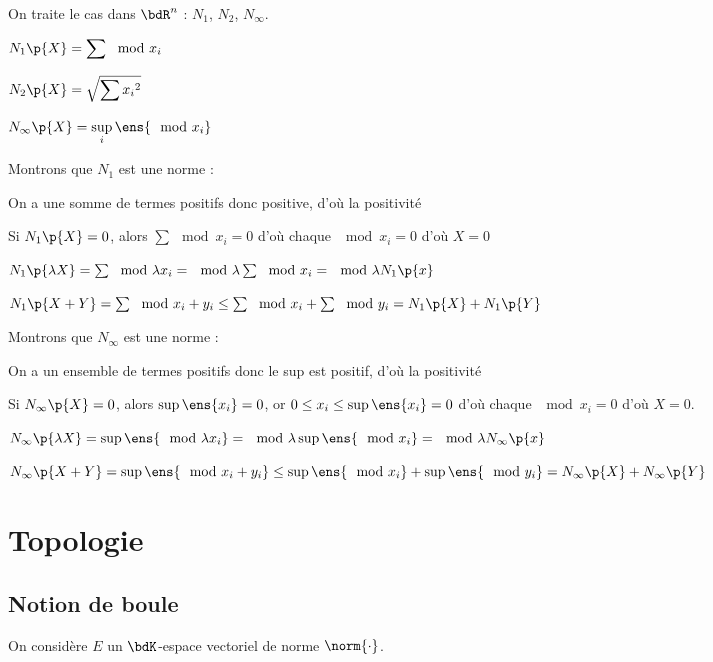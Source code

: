 \documentclass[a4paper,french,bookmarks]{book}
\begin{document}
    On traite le cas dans $\bdR^n$ : $N_1$, $N_2$, $N_\infty$. 
    \begin{enumerate}
        \itt $\displaystyle N_1\p{X} = \sum \mod{x_i}$
            
        \itt $\displaystyle N_2\p{X} = \sqrt{\sum {x_i}^2}$
            
        \itt $\displaystyle N_\infty\p{X} = \sup\limits_i\ens{\mod{x_i}}$
    \end{enumerate}
    Montrons que $N_1$ est une norme :
    \begin{enumerate}
        \itast On a une somme de termes positifs donc positive, d'où la positivité
        
        \itast Si $N_1\p{X} = 0$, alors $\sum \mod{x_i} = 0$ d'où chaque $\mod{x_i} = 0$ d'où $X = 0$
        
        \itast $N_1\p{\lambda X} = \sum \mod{\lambda x_i} = \mod{\lambda} \sum \mod{x_i} = \mod{\lambda} N_1\p{x}$
        
        \itast $N_1\p{X + Y} = \sum \mod{x_i + y_i} \leq \sum \mod{x_i} + \sum \mod{y_i} = N_1\p{X} + N_1\p{Y}$
    \end{enumerate}
    Montrons que $N_\infty$ est une norme :
    \begin{enumerate}
        \itast On a un ensemble de termes positifs donc le sup est positif, d'où la positivité
        
        \itast Si $N_\infty\p{X} = 0$, alors $\sup \ens{x_i} = 0$, or $0 \leq x_i \leq \sup \ens{x_i} = 0$ d'où chaque $\mod{x_i} = 0$ d'où $X = 0$.
        
        \itast $N_\infty\p{\lambda X} = \sup \ens{ \mod{\lambda x_i}} = \mod{\lambda} \sup \ens{\mod{x_i}} = \mod{\lambda} N_\infty\p{x}$
        
        \itast $N_\infty\p{X + Y} = \sup \ens{\mod{x_i + y_i}} \leq \sup \ens{\mod{x_i}} + \sup \ens{\mod{y_i}} = N_\infty\p{X} + N_\infty\p{Y}$
    \end{enumerate}
    
    \section{Topologie}
    
    \subsection{Notion de boule}
    On considère $E$ un $\bdK$-espace vectoriel de norme $\norm{\cdot}$.
    
\end{document}
